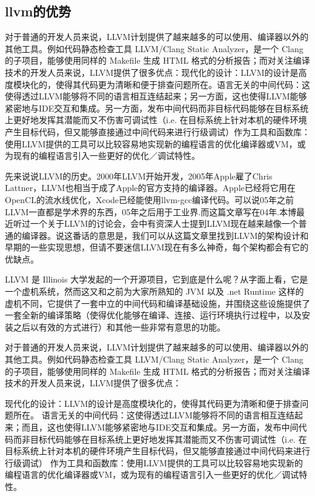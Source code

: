 \subsection{llvm的优势}

对于普通的开发人员来说，LLVM计划提供了越来越多的可以使用、编译器以外的其他工具。例如代码静态检查工具 LLVM/Clang Static Analyzer，是一个 Clang 的子项目，能够使用同样的 Makefile 生成 HTML 格式的分析报告；而对关注编译技术的开发人员来说，LLVM提供了很多优点：现代化的设计：LLVM的设计是高度模块化的，使得其代码更为清晰和便于排查问题所在。语言无关的中间代码：这使得透过LLVM能够将不同的语言相互连结起来；另一方面，这也使得LLVM能够紧密地与IDE交互和集成。另一方面，发布中间代码而非目标代码能够在目标系统上更好地发挥其潜能而又不伤害可调试性（i.e. 在目标系统上针对本机的硬件环境产生目标代码，但又能够直接通过中间代码来进行行级调试）作为工具和函数库：使用LLVM提供的工具可以比较容易地实现新的编程语言的优化编译器或VM，或为现有的编程语言引入一些更好的优化／调试特性。

先来说说LLVM的历史。2000年LLVM开始开发，2005年Apple雇了Chris Lattner，LLVM也相当于成了Apple的官方支持的编译器。Apple已经将它用在OpenCL的流水线优化，Xcode已经能使用llvm-gcc编译代码。可以说05年之前LLVM一直都是学术界的东西，05年之后用于工业界.而这篇文章写在04年.本博最近听过一个关于LLVM的讨论会，会中有资深人士提到LLVM现在越来越像一个普通的编译器。说这番话的意思是，我们可以从这篇文章里找到LLVM的架构设计和早期的一些实现思想，但请不要迷信LLVM现在有多么神奇，每个架构都会有它的优缺点。

LLVM 是 Illinois 大学发起的一个开源项目，它到底是什么呢？从字面上看，它是一个虚机系统，然而这又和之前为大家所熟知的 JVM 以及 .net Runtime 这样的虚机不同，它提供了一套中立的中间代码和编译基础设施，并围绕这些设施提供了一套全新的编译策略（使得优化能够在编译、连接、运行环境执行过程中，以及安装之后以有效的方式进行）和其他一些非常有意思的功能。

对于普通的开发人员来说，LLVM计划提供了越来越多的可以使用、编译器以外的其他工具。例如代码静态检查工具 LLVM/Clang Static Analyzer，是一个 Clang 的子项目，能够使用同样的 Makefile 生成 HTML 格式的分析报告；而对关注编译技术的开发人员来说，LLVM提供了很多优点：

现代化的设计：LLVM的设计是高度模块化的，使得其代码更为清晰和便于排查问题所在。 语言无关的中间代码：这使得透过LLVM能够将不同的语言相互连结起来；而且，这也使得LLVM能够紧密地与IDE交互和集成。另一方面，发布中间代码而非目标代码能够在目标系统上更好地发挥其潜能而又不伤害可调试性（i.e. 在目标系统上针对本机的硬件环境产生目标代码，但又能够直接通过中间代码来进行行级调试） 作为工具和函数库：使用LLVM提供的工具可以比较容易地实现新的编程语言的优化编译器或VM，或为现有的编程语言引入一些更好的优化／调试特性。

